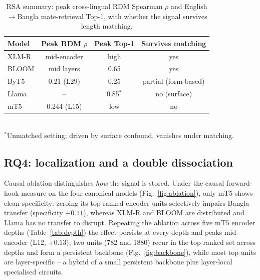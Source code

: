 \documentclass[preprint,12pt]{elsarticle}
\begin{document}
\begin{table}[H]
\caption{RSA summary: peak cross-lingual RDM Spearman $\rho$ and English$\to$Bangla mate-retrieval Top-1, with whether the signal survives length matching.}
\label{tab:rsa}
\centering
\small
\setlength{\tabcolsep}{5pt}
\begin{tabular}{lccc}
\toprule
\textbf{Model} & \textbf{Peak RDM $\rho$} & \textbf{Peak Top-1} & \textbf{Survives matching} \\
\midrule
XLM-R & mid-encoder & high & yes \\
BLOOM & mid layers  & 0.65 & yes \\
ByT5  & 0.21 (L29)  & 0.25 & partial (form-based) \\
Llama & --          & 0.85$^\ast$ & no (surface) \\
mT5   & 0.244 (L15) & low  & no \\
\bottomrule
\end{tabular}
\\[2pt]
{\footnotesize $^\ast$Unmatched setting; driven by surface confound, vanishes under matching.}
\end{table}

\subsection{RQ4: localization and a double dissociation}
Causal ablation distinguishes \emph{how} the signal is stored. Under the causal forward-hook measure on the four canonical models (Fig.~\ref{fig:ablation}), only mT5 shows clean specificity: zeroing its top-ranked encoder units selectively impairs Bangla transfer (specificity $+0.11$), whereas XLM-R and BLOOM are distributed and Llama has no transfer to disrupt. Repeating the ablation across five mT5 encoder depths (Table~\ref{tab:depth}) the effect persists at every depth and peaks mid-encoder (L12, $+0.13$); two units (782 and 1880) recur in the top-ranked set across depths and form a persistent backbone (Fig.~\ref{fig:backbone}), while most top units are layer-specific -- a hybrid of a small persistent backbone plus layer-local specialised circuits.
\end{document}
